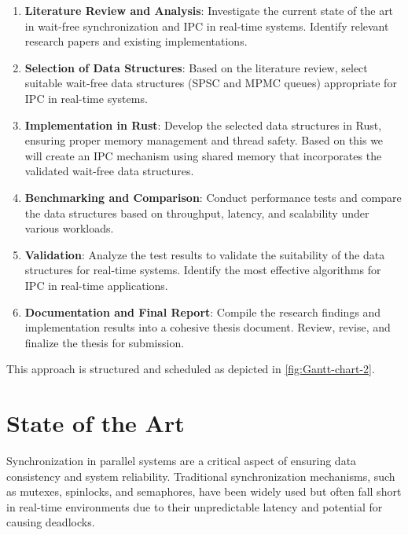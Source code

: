 \documentclass[ a4paper,
                toc=bibliography
              ]{scrartcl}
\begin{document}
\begin{enumerate}
	\item \textbf{Literature Review and Analysis}: Investigate the current state of the art in wait-free synchronization and IPC in real-time systems. Identify relevant research papers and existing implementations.
	
	\item \textbf{Selection of Data Structures}: Based on the literature review, select suitable wait-free data structures (SPSC and MPMC queues) appropriate for IPC in real-time systems.
	
	\item \textbf{Implementation in Rust}: Develop the selected data structures in Rust, ensuring proper memory management and thread safety. Based on this we will create an IPC mechanism using shared memory that incorporates the validated wait-free data structures.
	
	\item \textbf{Benchmarking and Comparison}: Conduct performance tests and compare the data structures based on throughput, latency, and scalability under various workloads.
	
	\item \textbf{Validation}: Analyze the test results to validate the suitability of the data structures for real-time systems. Identify the most effective algorithms for IPC in real-time applications.
	
	\item \textbf{Documentation and Final Report}: Compile the research findings and implementation results into a cohesive thesis document. Review, revise, and finalize the thesis for submission.
\end{enumerate}

This approach is structured and scheduled as depicted in \autoref{fig:Gantt-chart-2}.

\section{State of the Art}

Synchronization in parallel systems are a critical aspect of ensuring data consistency and system reliability. Traditional synchronization mechanisms, such as mutexes, spinlocks, and semaphores, have been widely used but often fall short in real-time environments due to their unpredictable latency and potential for causing deadlocks. \cite{herlihy1991wait,Brandenburg2010SpinBasedReaderWriterSynchronization,kode2024analysisSynchronization}
\end{document}
